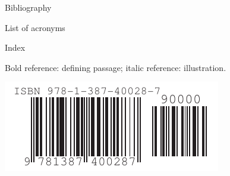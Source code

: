 \documentclass[11pt,letterpaper,twoside,openany]{boek3}
\begin{document}
 {Bibliography}



\vfill\pagebreak

 {List of acronyms}

\def\acitem#1#2{\item[#1] #2}
\def\acitemi#1#2#3{\item[#1]{#2}\index{#1|see{#3}}}

\begin{multicols}{2}
\begin{description}

\end{description}
\end{multicols}
\vfill\pagebreak

 {Index}


Bold reference: defining passage; italic reference: illustration.

\begin{multicols}{2}
\printindex
\end{multicols}

\hbox{}\vfill
\includegraphics{isbn_barcode}

\closeout\chapterlist
\end{document}
